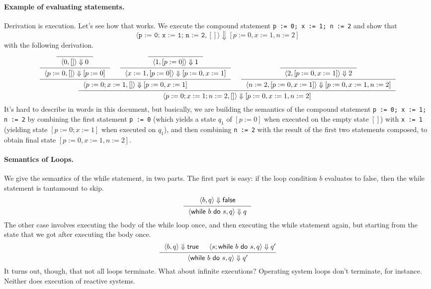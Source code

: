 \documentclass[11pt]{article}
\begin{document}
\paragraph{Example of evaluating statements.} Derivation is execution. Let's see how that works. We execute the compound statement \texttt{p := 0; x := 1; n := 2} and show that
\[ \langle \texttt{p := 0; x := 1; n := 2}, [] \rangle \Downarrow [p := 0, x := 1, n := 2] \]
with the following derivation.
{\small
\[
\begin{prooftree}
  \infer0{~~\langle 0, [] \rangle \Downarrow 0~~}
  \infer1{~~\langle p := 0, [] \rangle \Downarrow [p := 0]~~}
  \infer0{~~\langle 1, [p := 0]\rangle \Downarrow 1~~}
  \infer1{~~\langle x := 1, [p := 0] \rangle \Downarrow [p := 0, x := 1]~~}
  \infer2{~~\langle p:=0; x := 1, [] \rangle \Downarrow [p := 0, x := 1]~~}
  \infer0{~~\langle 2, [p:= 0, x := 1] \rangle \Downarrow 2~~}
  \infer1{~~\langle n := 2, [p := 0,x := 1] \rangle \Downarrow [p := 0, x := 1, n := 2]~~}
  \infer2{~~\langle p := 0; x := 1; n := 2, [] \rangle \Downarrow [p := 0,x:=1,n:=2]~~}
\end{prooftree}
\]
}
\noindent
It's hard to describe in words in this document, but basically, we are building the semantics of the compound statement \texttt{p := 0; x := 1; n := 2} by combining the first statement \texttt{p := 0} (which yields a state $q_1$ of $[p := 0]$ when executed on the empty state $[]$) with \texttt{x := 1} (yielding state $[p := 0; x := 1]$ when executed on $q_1$), and then combining \texttt{n := 2} with the result of the first two statements composed, to obtain final state $[p := 0,x:=1,n:=2]$.

\paragraph{Semantics of Loops.} We give the semantics of the \textsf{while} statement, in two parts. The first part is easy: if the loop condition $b$ evaluates to \textsf{false}, then the \textsf{while} statement is tantamount to \textsf{skip}.
\[
\begin{prooftree}
  \hypo{~~\langle b,q\rangle \Downarrow \mathsf{false}~~}
  \infer1{~~\langle \mathsf{while} ~b~ \mathsf{do} ~s,q\rangle \Downarrow q~~}
\end{prooftree}
\]
The other case involves executing the body of the while loop once, and then executing the while statement again, but starting from the state that we got after executing the body once.
\[
\begin{prooftree}
  \hypo{~~\langle b,q\rangle \Downarrow \mathsf{true}}
  \hypo{\langle s; \mathsf{while} ~b~ \mathsf{do} ~s, q\rangle \Downarrow q'}
  \infer2{~~\langle \mathsf{while} ~b~ \mathsf{do} ~s,q\rangle \Downarrow q'~~}
\end{prooftree}
\]
It turns out, though, that not all loops terminate. What about infinite executions? Operating system loops don't terminate, for instance. Neither does execution of reactive systems.
\end{document}
